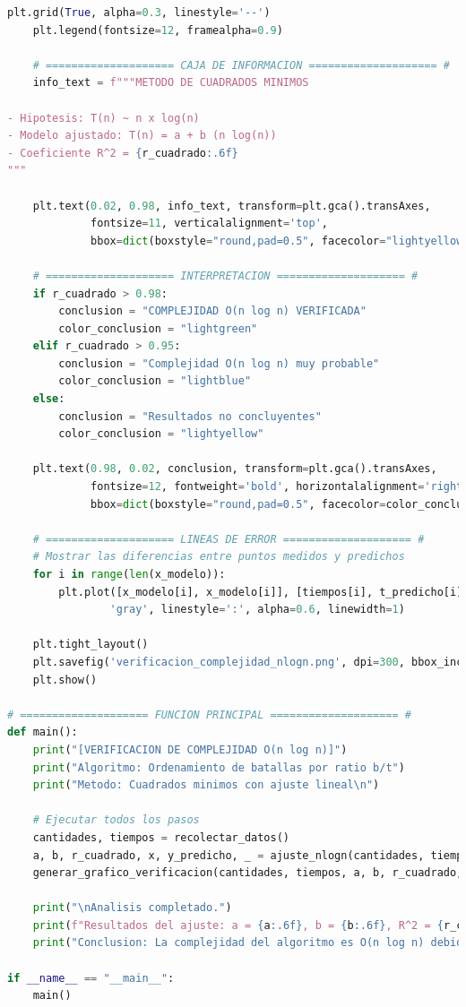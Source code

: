 \begin{lstlisting}[language=Python, caption=Código para ajuste por mínimos cuadrados]
    plt.grid(True, alpha=0.3, linestyle='--')
    plt.legend(fontsize=12, framealpha=0.9)
    
    # ==================== CAJA DE INFORMACION ==================== #
    info_text = f"""METODO DE CUADRADOS MINIMOS
    
- Hipotesis: T(n) ~ n x log(n)
- Modelo ajustado: T(n) = a + b (n log(n))
- Coeficiente R^2 = {r_cuadrado:.6f}
"""
    
    plt.text(0.02, 0.98, info_text, transform=plt.gca().transAxes, 
             fontsize=11, verticalalignment='top',
             bbox=dict(boxstyle="round,pad=0.5", facecolor="lightyellow", alpha=0.9))
    
    # ==================== INTERPRETACION ==================== #
    if r_cuadrado > 0.98:
        conclusion = "COMPLEJIDAD O(n log n) VERIFICADA"
        color_conclusion = "lightgreen"
    elif r_cuadrado > 0.95:
        conclusion = "Complejidad O(n log n) muy probable"
        color_conclusion = "lightblue"
    else:
        conclusion = "Resultados no concluyentes"
        color_conclusion = "lightyellow"
    
    plt.text(0.98, 0.02, conclusion, transform=plt.gca().transAxes, 
             fontsize=12, fontweight='bold', horizontalalignment='right',
             bbox=dict(boxstyle="round,pad=0.5", facecolor=color_conclusion, alpha=0.9))
    
    # ==================== LINEAS DE ERROR ==================== #
    # Mostrar las diferencias entre puntos medidos y predichos
    for i in range(len(x_modelo)):
        plt.plot([x_modelo[i], x_modelo[i]], [tiempos[i], t_predicho[i]], 
                'gray', linestyle=':', alpha=0.6, linewidth=1)
    
    plt.tight_layout()
    plt.savefig('verificacion_complejidad_nlogn.png', dpi=300, bbox_inches='tight')
    plt.show()

# ==================== FUNCION PRINCIPAL ==================== #
def main():
    print("[VERIFICACION DE COMPLEJIDAD O(n log n)]")
    print("Algoritmo: Ordenamiento de batallas por ratio b/t")
    print("Metodo: Cuadrados minimos con ajuste lineal\n")
    
    # Ejecutar todos los pasos
    cantidades, tiempos = recolectar_datos()
    a, b, r_cuadrado, x, y_predicho, _ = ajuste_nlogn(cantidades, tiempos)
    generar_grafico_verificacion(cantidades, tiempos, a, b, r_cuadrado, x, y_predicho)

    print("\nAnalisis completado.")
    print(f"Resultados del ajuste: a = {a:.6f}, b = {b:.6f}, R^2 = {r_cuadrado:.6f}")
    print("Conclusion: La complejidad del algoritmo es O(n log n) debido a la alta calidad del ajuste.")

if __name__ == "__main__":
    main()
\end{lstlisting}

